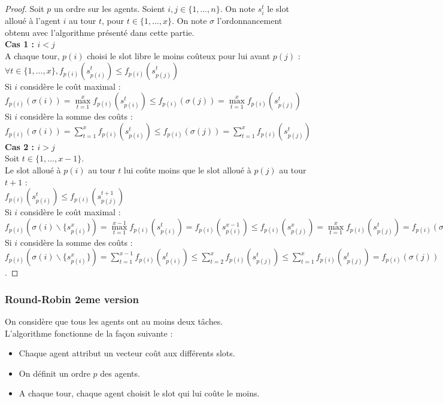 \documentclass[12pt]{article}
\theoremstyle{definition}
\begin{document}
\begin{proof}
Soit $p$ un ordre sur les agents. Soient $i, j \in \{1, \dots, n\}$. On note $s_i^t$ le slot alloué à l'agent $i$ au tour $t$, pour $t\in\{1,\dots,x\}$. On note $\sigma$ l'ordonnancement obtenu avec l'algorithme présenté dans cette partie.\\
\textbf{Cas 1 : $i<j$}\\
A chaque tour, $p(i)$ choisi le slot libre le moins coûteux pour lui avant $p(j)$ :\\
 $\forall t\in \{1, \dots, x\}, f_{p(i)}(s^t_{p(i)})\leq f_{p(i)}(s^t_{p(j)})$\\
 Si $i$ considère le coût maximal : $f_{p(i)}(\sigma(i)) = \max\limits_{t = 1}^x f_{p(i)}(s^t_{p(i)}) \leq f_{p(i)}(\sigma(j)) = \max\limits_{t = 1}^x f_{p(i)}(s^t_{p(j)})$\\
 Si $i$ considère la somme des coûts : $f_{p(i)}(\sigma(i)) = \sum\limits_{t = 1}^x f_{p(i)}(s^t_{p(i)})\leq f_{p(i)}(\sigma(j)) = \sum\limits_{t = 1}^x f_{p(i)}(s^t_{p(j)})$\\
\textbf{Cas 2 : $i>j$}\\
Soit $t\in\{1,\dots,x-1\}$.\\
Le slot alloué à $p(i)$ au tour $t$ lui coûte moins que le slot alloué à $p(j)$ au tour $t+1$ : \\
$f_{p(i)}(s^t_{p(i)})\leq f_{p(i)}(s^{t+1}_{p(j)})$\\
Si $i$ considère le coût maximal : \\
$f_{p(i)}(\sigma(i)\backslash\{s_{p(i)}^x\}) = \max\limits_{t = 1}^{x-1} f_{p(i)}(s^t_{p(i)}) = f_{p(i)}(s^{x-1}_{p(i)}) \leq f_{p(i)}(s^x_{p(j)}) = \max\limits_{t = 1}^{x} f_{p(i)}(s^t_{p(j)}) = f_{p(i)}(\sigma(j))$\\
Si $i$ considère la somme des coûts : \\
$f_{p(i)}(\sigma(i)\backslash\{s_{p(i)}^x\}) = \sum\limits_{t = 1}^{x-1} f_{p(i)}(s^t_{p(i)}) \leq \sum\limits_{t = 2}^{x} f_{p(i)}(s^t_{p(j)}) \leq \sum\limits_{t = 1}^{x} f_{p(i)}(s^t_{p(j)}) = f_{p(i)}(\sigma(j))$.
\end{proof}

\subsubsection{Round-Robin 2eme version}
\noindent
On considère que tous les agents ont au moins deux tâches.\\
L'algorithme fonctionne de la façon suivante :
\begin{itemize}
	\item Chaque agent attribut un vecteur coût aux différents slots.
	\item On définit un ordre $p$ des agents.
	\item A chaque tour, chaque agent choisit le slot qui lui coûte le moins.
\end{itemize}
\end{document}
